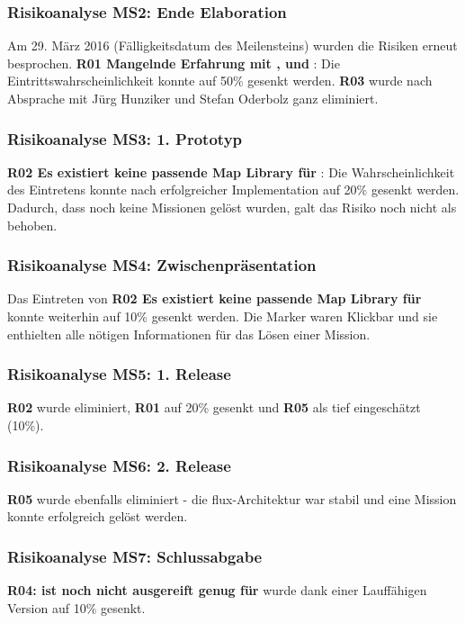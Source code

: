 \subsubsection{Risikoanalyse MS2: Ende Elaboration}
Am 29. März 2016 (Fälligkeitsdatum des Meilensteins) wurden die Risiken erneut besprochen.
\textbf{R01 Mangelnde Erfahrung mit ,  und }: Die Eintrittswahrscheinlichkeit konnte auf 50\% gesenkt werden. \textbf{R03} wurde nach Absprache mit Jürg Hunziker und Stefan Oderbolz ganz eliminiert.

\subsubsection{Risikoanalyse MS3: 1. Prototyp}
\textbf{R02 Es existiert keine passende Map Library für }: Die Wahrscheinlichkeit des Eintretens konnte nach erfolgreicher Implementation auf 20\% gesenkt werden. Dadurch, dass noch keine Missionen gelöst wurden, galt das Risiko noch nicht als behoben.

\subsubsection{Risikoanalyse MS4: Zwischenpräsentation}
Das Eintreten von \textbf{R02 Es existiert keine passende Map Library für } konnte weiterhin auf 10\% gesenkt werden. Die Marker waren Klickbar und sie enthielten alle nötigen Informationen für das Lösen einer Mission.

\subsubsection{Risikoanalyse MS5: 1. Release}
\textbf{R02} wurde eliminiert, \textbf{R01} auf 20\% gesenkt und \textbf{R05} als tief eingeschätzt (10\%).

\subsubsection{Risikoanalyse MS6: 2. Release}
\textbf{R05} wurde ebenfalls eliminiert - die flux-Architektur war stabil und eine Mission konnte erfolgreich gelöst werden.

\subsubsection{Risikoanalyse MS7: Schlussabgabe}
\textbf{R04:  ist noch nicht ausgereift genug für } wurde dank einer Lauffähigen Version auf 10\% gesenkt.
